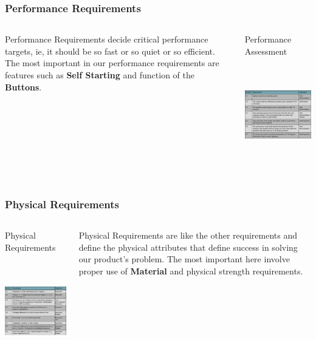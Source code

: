\documentclass[aspectratio=169]{beamer}
\begin{document}
\begin{frame}
    \frametitle{Performance Requirements}

    \begin{columns}
        \begin{column}{0.48\textwidth}
            Performance Requirements decide critical performance targets, ie, it should be so
            fast or so quiet or so efficient. The most important in our performance requirements
            are features such as \textbf{Self Starting} and function of the \textbf{Buttons}.
        \end{column}

        \begin{column}{0.48\textwidth}
            \begin{block}{Performance Assessment}
                \includegraphics[height=5cm]{PerformanceRequirement}
            \end{block}
        \end{column}
    \end{columns}
\end{frame}

\begin{frame}
    \frametitle{Physical Requirements}

    \begin{columns}
        \begin{column}{0.48\textwidth}
            \begin{block}{Physical Requirements}
                \includegraphics[height=5cm]{PhysicalRequirement}
            \end{block}
        \end{column}

        \begin{column}{0.48\textwidth}
            Physical Requirements are like the other requirements and define the physical
            attributes that define success in solving our product's problem. The most important here
            involve proper use of \textbf{Material} and physical strength requirements.
        \end{column}
    \end{columns}
\end{frame}
\end{document}
